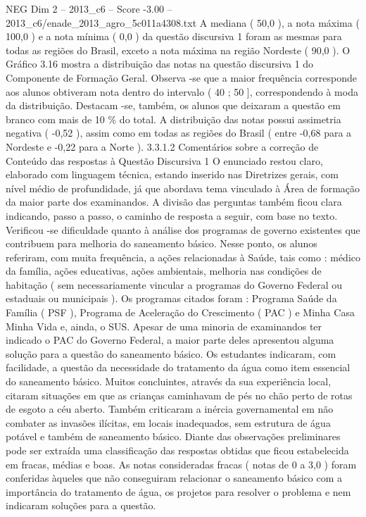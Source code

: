 \begin{textsample}{NEG Dim 2 – 2013\_c6 – Score -3.00 – 2013\_c6/enade\_2013\_agro\_5c011a4308.txt}
A mediana ( 50,0 ), a nota máxima ( 100,0 ) e a nota mínima ( 0,0 ) da questão discursiva 1 foram as mesmas para todas as regiões do Brasil, exceto a nota máxima na região Nordeste ( 90,0 ).
O Gráfico 3.16 mostra a distribuição das notas na questão discursiva 1 do Componente de Formação Geral.
Observa -se que a maior frequência corresponde aos alunos obtiveram nota dentro do intervalo ( 40 ; 50 ], correspondendo à moda da distribuição.
Destacam -se, também, os alunos que deixaram a questão em branco com mais de 10 \% do total.
A distribuição das notas possui assimetria negativa ( -0,52 ), assim como em todas as regiões do Brasil ( entre -0,68 para a Nordeste e -0,22 para a Norte ). 3.3.1.2 Comentários sobre a correção de Conteúdo das respostas à Questão Discursiva 1 O enunciado restou claro, elaborado com linguagem técnica, estando inserido nas Diretrizes gerais, com nível médio de profundidade, já que abordava tema vinculado à Área de formação da maior parte dos examinandos.
A divisão das perguntas também ficou clara indicando, passo a passo, o caminho de resposta a seguir, com base no texto.
Verificou -se dificuldade quanto à análise dos programas de governo existentes que contribuem para melhoria do saneamento básico.
Nesse ponto, os alunos referiram, com muita frequência, a ações relacionadas à Saúde, tais como : médico da família, ações educativas, ações ambientais, melhoria nas condições de habitação ( sem necessariamente vincular a programas do Governo Federal ou estaduais ou municipais ).
Os programas citados foram : Programa Saúde da Família ( PSF ), Programa de Aceleração do Crescimento ( PAC ) e Minha Casa Minha Vida e, ainda, o SUS.
Apesar de uma minoria de examinandos ter indicado o PAC do Governo Federal, a maior parte deles apresentou alguma solução para a questão do saneamento básico.
Os estudantes indicaram, com facilidade, a questão da necessidade do tratamento da água como item essencial do saneamento básico.
Muitos concluintes, através da sua experiência local, citaram situações em que as crianças caminhavam de pés no chão perto de rotas de esgoto a céu aberto.
Também criticaram a inércia governamental em não combater as invasões ilícitas, em locais inadequados, sem estrutura de água potável e também de saneamento básico.
Diante das observações preliminares pode ser extraída uma classificação das respostas obtidas que ficou estabelecida em fracas, médias e boas.
As notas consideradas fracas ( notas de 0 a 3,0 ) foram conferidas àqueles que não conseguiram relacionar o saneamento básico com a importância do tratamento de água, os projetos para resolver o problema e nem indicaram soluções para a questão.

\end{textsample}
